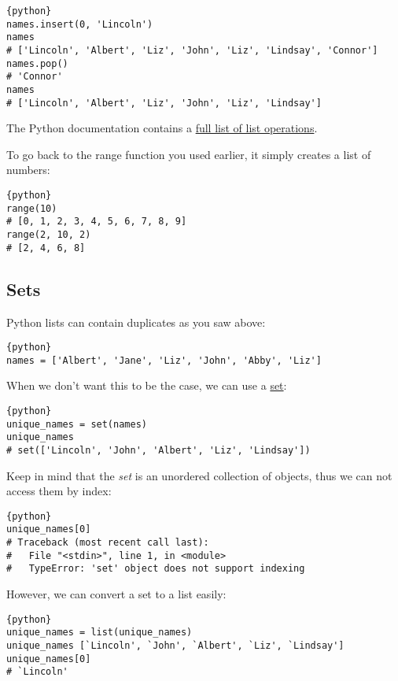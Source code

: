 \begin{lstlisting}{python}
names.insert(0, 'Lincoln')
names
# ['Lincoln', 'Albert', 'Liz', 'John', 'Liz', 'Lindsay', 'Connor']
names.pop()
# 'Connor'
names
# ['Lincoln', 'Albert', 'Liz', 'John', 'Liz', 'Lindsay']
\end{lstlisting}

The Python documentation contains a \href{}{full list of list
operations}.

To go back to the range function you used earlier, it simply creates a
list of numbers:

\begin{lstlisting}{python}
range(10)
# [0, 1, 2, 3, 4, 5, 6, 7, 8, 9]
range(2, 10, 2)
# [2, 4, 6, 8]
\end{lstlisting}

\subsection{Sets}\label{sets}

Python lists can contain duplicates as you saw above:

\begin{lstlisting}{python}
names = ['Albert', 'Jane', 'Liz', 'John', 'Abby', 'Liz']
\end{lstlisting}

When we don't want this to be the case, we can use a
\href{https://docs.python.org/2/library/stdtypes.html\#set}{set}:

\begin{lstlisting}{python}
unique_names = set(names)
unique_names
# set(['Lincoln', 'John', 'Albert', 'Liz', 'Lindsay'])
\end{lstlisting}

Keep in mind that the \emph{set} is an unordered collection of objects,
thus we can not access them by index:

\begin{lstlisting}{python}
unique_names[0]
# Traceback (most recent call last):
#   File "<stdin>", line 1, in <module>
#   TypeError: 'set' object does not support indexing
\end{lstlisting}

However, we can convert a set to a list easily:

\begin{lstlisting}{python}
unique_names = list(unique_names) 
unique_names [`Lincoln', `John', `Albert', `Liz', `Lindsay']
unique_names[0]
# `Lincoln'
\end{lstlisting}

